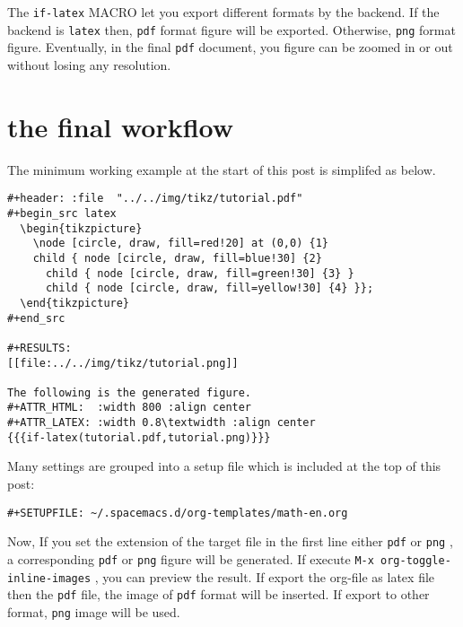 \documentclass[koma,a4paper,utopia,12pt,listings-color,microtype,paralist,colorlinks,urlcolor=red]{org-article}
\begin{document}
The \texttt{if-latex} MACRO let you export different formats by the backend. If the
backend is \texttt{latex} then, \texttt{pdf} format figure will be exported. Otherwise, \texttt{png} format
figure. Eventually, in the final \texttt{pdf} document, you figure can be zoomed in or
out without losing any resolution.

\section{the final workflow}
\label{sec:org0400fae}


The minimum working example at the start of this post is simplifed as below.

\begin{verbatim}
#+header: :file  "../../img/tikz/tutorial.pdf"
#+begin_src latex
  \begin{tikzpicture}
    \node [circle, draw, fill=red!20] at (0,0) {1}
    child { node [circle, draw, fill=blue!30] {2}
      child { node [circle, draw, fill=green!30] {3} }
      child { node [circle, draw, fill=yellow!30] {4} }};
  \end{tikzpicture}
#+end_src

#+RESULTS:
[[file:../../img/tikz/tutorial.png]]

The following is the generated figure.
#+ATTR_HTML:  :width 800 :align center
#+ATTR_LATEX: :width 0.8\textwidth :align center
{{{if-latex(tutorial.pdf,tutorial.png)}}}
\end{verbatim}

Many settings are grouped into a setup file which is included at the top of this
post:
\begin{verbatim}
#+SETUPFILE: ~/.spacemacs.d/org-templates/math-en.org
\end{verbatim}

Now, If you set the extension of the target file in the first line either \texttt{pdf} or
\texttt{png} , a corresponding \texttt{pdf} or \texttt{png} figure will be generated. If execute \texttt{M-x
org-toggle-inline-images}  , you can preview the result. If export the org-file
as latex file then the \texttt{pdf} file, the image of \texttt{pdf} format will be inserted. If
export to other format, \texttt{png} image will be used.
\end{document}
